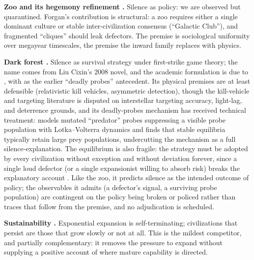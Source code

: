\documentclass[11pt]{article}
\begin{document}
\textbf{Zoo \citep{Ball1973} and its hegemony refinement \citep{Forgan2017}.} Silence as policy: we are observed but quarantined. Forgan's contribution is structural: a zoo requires either a single dominant culture or stable inter-civilization consensus (``Galactic Club''), and fragmented ``cliques'' should leak defectors. The premise is sociological uniformity over megayear timescales, the premise the inward family replaces with physics.

\textbf{Dark forest \citep{Brin1983,Yu2015}.} Silence as survival strategy under first-strike game theory; the name comes from Liu Cixin's 2008 novel, and the academic formulation is due to \citet{Yu2015}, with \citet{Brin1983} as the earlier ``deadly probes'' antecedent. Its physical premises are at least defensible (relativistic kill vehicles, asymmetric detection), though the kill-vehicle and targeting literature is disputed on interstellar targeting accuracy, light-lag, and deterrence grounds, and its deadly-probes mechanism has received technical treatment: \citet{Forgan2019Probes} models mutated ``predator'' probes suppressing a visible probe population with Lotka--Volterra dynamics and finds that stable equilibria typically retain large prey populations, undercutting the mechanism as a full silence-explanation. The equilibrium is also fragile: the strategy must be adopted by every civilization without exception and without deviation forever, since a single loud defector (or a single expansionist willing to absorb risk) breaks the explanatory account \citep{Brin1983,Forgan2017}. Like the zoo, it predicts silence as the intended outcome of policy; the observables it admits (a defector's signal, a surviving probe population) are contingent on the policy being broken or policed rather than traces that follow from the premise, and no adjudication is scheduled.

\textbf{Sustainability \citep{HaqqMisraBaum2009}.} Exponential expansion is self-terminating; civilizations that persist are those that grow slowly or not at all. This is the mildest competitor, and partially complementary: it removes the pressure to expand without supplying a positive account of where mature capability is directed.
\end{document}
